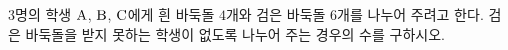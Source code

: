 $3$명의 학생 $\mathrm{A}$, $\mathrm{B}$, $\mathrm{C}$에게 흰 바둑돌 $4$개와 검은 바둑돌 $6$개를 나누어 주려고 한다. 검은 바둑돌을 받지 못하는 학생이 없도록 나누어 주는 경우의 수를 구하시오. 
